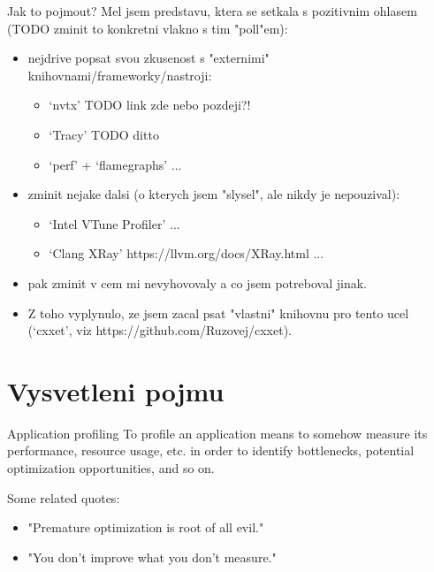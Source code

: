 \documentclass[aspectratio=169]{beamer}
\begin{document}
\begin{frame}
    Jak to pojmout? Mel jsem predstavu, ktera se setkala s pozitivnim ohlasem (TODO zminit to konkretni vlakno s tim "poll"em):

    \begin{itemize}
        \item nejdrive popsat svou zkusenost s "externimi" knihovnami/frameworky/nastroji:
        \begin{itemize}
            \item `nvtx' TODO link zde nebo pozdeji?!
            \item `Tracy' TODO ditto
            \item `perf' + `flamegraphs' ...
        \end{itemize}
        \item zminit nejake dalsi (o kterych jsem "slysel", ale nikdy je nepouzival):
        \begin{itemize}
            \item `Intel VTune Profiler' ...
            \item `Clang XRay' https://llvm.org/docs/XRay.html ...
        \end{itemize}
        \item pak zminit v cem mi nevyhovovaly a co jsem potreboval jinak.
        \item Z toho vyplynulo, ze jsem zacal psat "vlastni" knihovnu pro tento ucel (`cxxet', viz https://github.com/Ruzovej/cxxet).
    \end{itemize}

\end{frame}



\section{Vysvetleni pojmu}

\begin{frame}{Application profiling}
    To profile an application means to somehow measure its performance, resource usage, etc. in order to identify bottlenecks, potential optimization opportunities, and so on.

    Some related quotes:
    \begin{itemize}
        \item "Premature optimization is root of all evil."
        \item "You don't improve what you don't measure."
    \end{itemize}

\end{frame}
\end{document}
